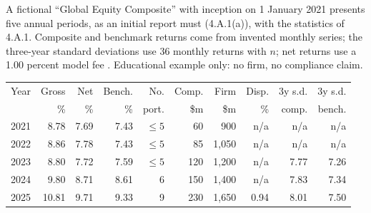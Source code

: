 \begin{qfexample}\label{ex:gips-composite-report}
 A fictional ``Global Equity Composite'' with inception on 1 January 2021 presents five annual periods, as an initial report must (4.A.1(a)), with the statistics of 4.A.1. Composite and benchmark returns come from invented monthly series; the three-year standard deviations use 36 monthly returns with $n$; net returns use a 1.00 percent model fee \citep[provisions 4.A.1--4.A.3 and~4.C.1--4.C.11, pp.~21--27]{wide-gips-2020}. Educational example only: no firm, no compliance claim.
\begin{center}\small
\begin{tabular}{@{}lrrrrrrrrr@{}}
\toprule
Year & Gross & Net & Bench. & No. & Comp. & Firm & Disp. & 3y s.d. & 3y s.d. \\
 & \% & \% & \% & port. & \$m & \$m & \% & comp. & bench. \\
\midrule
2021 & 8.78 & 7.69 & 7.43 & $\le5$ & 60 & 900 & n/a & n/a & n/a \\
2022 & 8.86 & 7.78 & 7.43 & $\le5$ & 85 & 1{,}050 & n/a & n/a & n/a \\
2023 & 8.80 & 7.72 & 7.59 & $\le5$ & 120 & 1{,}200 & n/a & 7.77 & 7.26 \\
2024 & 9.80 & 8.71 & 8.61 & 6 & 150 & 1{,}400 & n/a & 7.83 & 7.34 \\
2025 & 10.81 & 9.71 & 9.33 & 9 & 230 & 1{,}650 & 0.94 & 8.01 & 7.50 \\
\bottomrule
\end{tabular}
\end{center}


\end{qfexample}
